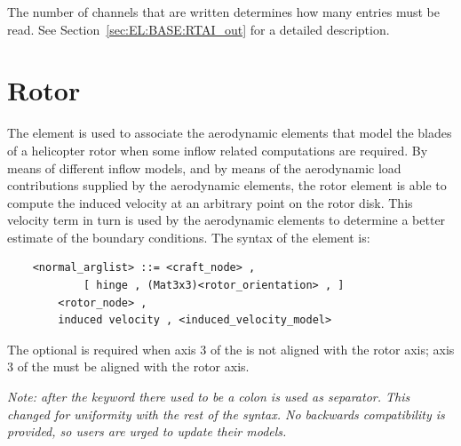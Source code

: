 The number of channels  that are written
determines how many  entries must be read.
See Section~\ref{sec:EL:BASE:RTAI_out} for a detailed description.






\section{Rotor}
The  element is used to associate the aerodynamic elements that
model the blades of a helicopter rotor when some inflow related computations 
are required.
By means of different inflow models, and by means of the
aerodynamic load contributions supplied by the aerodynamic elements, the
rotor element is able to compute the induced velocity at an arbitrary point on
the rotor disk. This velocity term in turn is used by the aerodynamic
elements to determine a better estimate of the boundary conditions.
The syntax of the  element is:
\begin{verbatim}
    <normal_arglist> ::= <craft_node> ,
            [ hinge , (Mat3x3)<rotor_orientation> , ]
        <rotor_node> ,
        induced velocity , <induced_velocity_model>
\end{verbatim}
The optional  is required when axis 3 
of the  is not aligned with the rotor axis; axis 3
of the  must be aligned with the rotor axis.

\emph{Note: after the keyword  there used to be
a colon is used as separator.
This changed for uniformity with the rest of the syntax.
No backwards compatibility is provided, so users are urged to update
their models.
}

